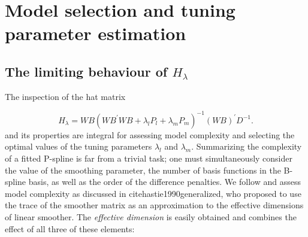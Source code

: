 \documentclass[12pt]{article}
\theoremstyle{definition}
\begin{document}
\section{Model selection and tuning parameter estimation}

\subsection{The limiting behaviour of $H_\lambda$}


The inspection of the hat matrix 

\[
H_\lambda = W B\left(W B^\prime W B +  \lambda_l P_l + \lambda_m P_m \right)^{-1} \left(W B\right)^\prime D^{-1}.
\]
\noindent
and its properties are integral for assessing model complexity and selecting the optimal values of the tuning parameters $\lambda_l$ and $\lambda_m.$  Summarizing the complexity of a fitted P-spline is far from a trivial task; one must simultaneously consider the value of the smoothing parameter, the number of basis functions in the B-spline basis, as well as the order of the difference penalties. We follow \citet{eilers1996flexible} and\citet{marx2005multidimensional} assess model complexity as discussed in cite{hastie1990generalized}, who proposed to use the trace of the smoother matrix as an approximation  to the effective dimensions of linear smoother. The \emph{effective dimension} is easily obtained and combines the effect of all three of these elements: 

%
\end{document}
